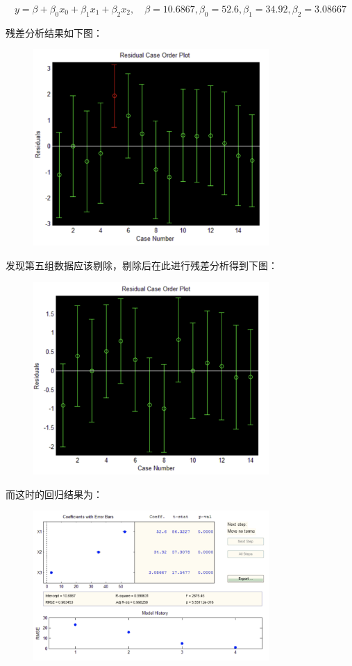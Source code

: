 \documentclass{article}
\begin{document}
$$y=\beta +\beta_0x_0+\beta_1x_1+\beta_2x_2,\quad\beta=10.6867,\beta_0=52.6,\beta_1=34.92,\beta_2=3.08667$$

残差分析结果如下图：

\begin{figure}[H]
    \centering
    \includegraphics[width=0.8\textwidth]{pic19.png}
\end{figure}

发现第五组数据应该剔除，剔除后在此进行残差分析得到下图：

\begin{figure}[H]
    \centering
    \includegraphics[width=0.8\textwidth]{pic20.png}
\end{figure}

而这时的回归结果为：

\begin{figure}[H]
    \centering
    \includegraphics[width=0.8\textwidth]{pic21.png}
\end{figure}
\end{document}
